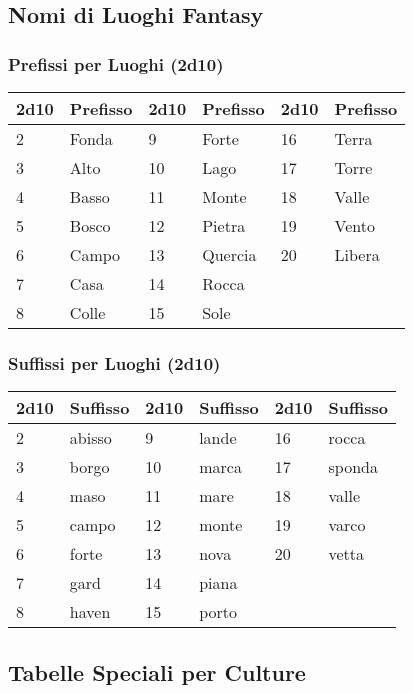 \begin{multicols}{2}
{\subsection*{Nomi di Luoghi Fantasy}

\subsubsection*{Prefissi per Luoghi (2d10)}
\noindent\begin{tabularx}{\linewidth}{X|l|X|l|X|l}
	\toprule
	\textbf{2d10} & \textbf{Prefisso} & \textbf{2d10} & \textbf{Prefisso} & \textbf{2d10} & \textbf{Prefisso} \\
\toprule
	2 & Fonda & 9 & Forte & 16 & Terra \\
	3 & Alto & 10 & Lago & 17 & Torre \\
	4 & Basso & 11 & Monte & 18 & Valle \\
	5 & Bosco & 12 & Pietra & 19 & Vento \\
	6 & Campo & 13 & Quercia & 20 & Libera \\
	7 & Casa & 14 & Rocca & & \\
	8 & Colle & 15 & Sole & & \\
\end{tabularx}

\subsubsection*{Suffissi per Luoghi (2d10)}

\noindent\begin{tabularx}{\linewidth}{X|l|X|l|X|l}
\toprule
	\textbf{2d10} & \textbf{Suffisso} & \textbf{2d10} & \textbf{Suffisso} & \textbf{2d10} & \textbf{Suffisso} \\
\toprule
	2 & abisso & 9 & lande & 16 & rocca \\
	3 & borgo & 10 & marca & 17 & sponda \\
	4 & maso & 11 & mare & 18 & valle \\
	5 & campo & 12 & monte & 19 & varco \\
	6 & forte & 13 & nova & 20 & vetta \\
	7 & gard & 14 & piana & & \\
	8 & haven & 15 & porto & & \\
\end{tabularx}


\subsection*{Tabelle Speciali per Culture}

}
\end{multicols}
